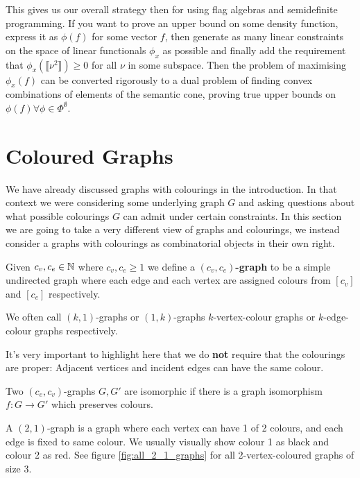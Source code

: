 This gives us our overall strategy then for using flag algebras and semidefinite programming.
If you want to prove an upper bound on some density function, express it as $\phi(f)$ for
some vector $f$, then generate as many linear constraints on the space of linear functionals
$\phi_x$ as possible and finally add the requirement that $\phi_x(\llbracket \nu^2\rrbracket)\geq 0$
for all $\nu$ in some subspace. Then the problem of maximising $\phi_x(f)$ can be
converted rigorously to a dual problem of finding convex combinations of elements of the
semantic cone, proving true upper bounds on $\phi(f)\forall\phi\in\Phi^\emptyset$.

\section{Coloured Graphs}
\label{sec:coloured_graphs}

We have already discussed graphs with colourings in the introduction. In that context
we were considering some underlying graph $G$ and asking questions about what possible
colourings $G$ can admit under certain constraints. In this section we are going to take
a very different view of graphs and colourings, we instead consider a graphs with colourings
as combinatorial objects in their own right.

\begin{definition}[$(c_v, c_e)$-Graph]
    Given $c_v, c_e \in \mathbb{N}$ where $c_v, c_e \geq 1$ we define a
    \textbf{$(c_v, c_e)$-graph} to be a simple undirected graph where each edge and
    each vertex are assigned colours from $[c_v]$ and $[c_e]$ respectively.

    We often call $(k, 1)$-graphs or $(1,k)$-graphs $k$-vertex-colour graphs or
    $k$-edge-colour graphs respectively.
\end{definition}
\begin{note}
    It's very important to highlight here that we do \textbf{not} require that the colourings
    are proper: Adjacent vertices and incident edges can have the same colour.
\end{note}
\begin{definition}
    Two $(c_e,c_v)$-graphs $G, G'$ are isomorphic if there is a graph isomorphism
    $f\colon G \to G'$ which preserves colours.
\end{definition}

\begin{example}
    A $(2, 1)$-graph is a graph where each vertex can have 1 of 2 colours, and each edge is fixed
    to same colour. We usually visually show colour 1 as black and colour 2 as red. See
    figure \ref{fig:all_2_1_graphs} for all 2-vertex-coloured graphs of size 3.
\end{example}

